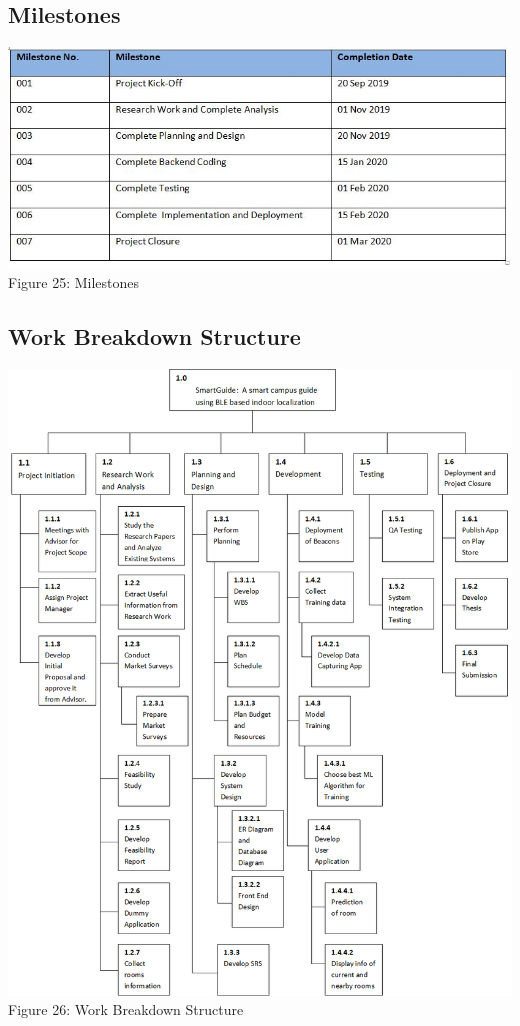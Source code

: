 \documentclass{article}
\begin{document}
\subsection{Milestones}
\begin{center}
\includegraphics[scale=0.8]{milestone}
\\Figure 25: Milestones
\end{center}
\subsection{Work Breakdown Structure}
\begin{center}
\includegraphics[scale=0.6]{WBS}
\\Figure 26: Work Breakdown Structure
\end{center}
\end{document}
